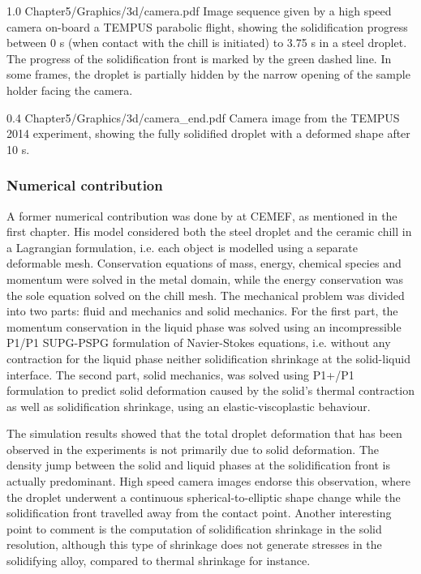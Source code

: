 \begin{figureth}
{1.0}
{Chapter5/Graphics/3d/camera.pdf}
{Image sequence given by a high speed camera on-board a TEMPUS parabolic flight, showing the 
solidification progress between 0 s (when contact with the chill is initiated) to 3.75 s in a  steel droplet. 
The progress of the solidification front is marked by the green dashed line. In some frames, the droplet is partially hidden by the narrow 
opening of the sample holder facing the camera.}
\label{fig:camera}
\end{figureth}

\begin{figureth}
{0.4}
{Chapter5/Graphics/3d/camera_end.pdf}
{Camera image from the TEMPUS 2014 experiment, showing the fully solidified droplet with a deformed shape after 10 s.}
\label{fig:camera_end}
\end{figureth}

\subsubsection{Numerical contribution}

A former numerical contribution was done by \citet{rivaux_simulation_2011} at CEMEF, as mentioned in the first chapter. 
His model considered both the steel droplet and the ceramic chill in a Lagrangian formulation, i.e. each object is
modelled using a separate deformable mesh. Conservation equations of mass, energy,
chemical species and momentum were solved in the metal domain, while the energy
conservation was the sole equation solved on the chill mesh. The mechanical problem was divided
into two parts: fluid and mechanics and solid mechanics. For the first part, the momentum conservation in the liquid phase was solved using an
incompressible P1/P1 SUPG-PSPG formulation of Navier-Stokes equations, i.e. 
without any contraction for the liquid phase neither solidification shrinkage at the solid-liquid interface.
The second part, solid mechanics, was solved using P1+/P1 formulation to predict solid deformation caused by the 
solid's thermal contraction as well as solidification shrinkage, 
using an elastic-viscoplastic behaviour. 

The simulation results showed that the total droplet deformation that has been
observed in the experiments is not primarily due to solid deformation. The density jump
between the solid and liquid phases at the solidification front is actually predominant. High
speed camera images endorse this observation, where the droplet underwent a continuous
spherical-to-elliptic shape change while the solidification front travelled away from the
contact point. Another interesting point to comment is the computation of solidification
shrinkage in the solid resolution, although this type of shrinkage does not generate stresses 
in the solidifying alloy, compared to thermal shrinkage for instance.

